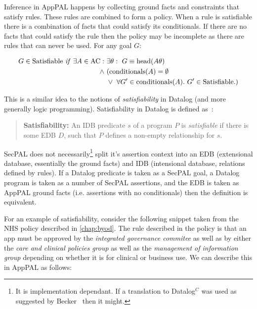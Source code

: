 \documentclass[thesis.tex]{subfiles}
\begin{document}
Inference in AppPAL happens by collecting ground facts and constraints
that satisfy rules. These rules are combined to form a policy. When a
rule is satisfiable there is a combination of facts that could satisfy
its conditionals. If there are no facts that could satisfy the rule
then the policy may be incomplete as there are rules that can never be
used.  For any goal $G$:

\begin{align*}
  G \in \text{Satisfiable}~\text{\textit{if}}~\exists A \in \text{AC}:~&\exists \theta:~G\equiv\text{head}(A\theta) \\
                                                              \wedge~ & (\text{conditionals}(A) = \emptyset \\
                                                                      & \vee~\forall G^\prime \in \text{conditionals}(A).~G^\prime \in \text{Satisfiable}.)
\end{align*}

This is a similar idea to the notions of \emph{satisfiability} in Datalog (and
more generally logic programming).  Satisfiability in Datalog is defined
as~\cite{alon_levy_equivalence_1993}:

\begin{quote}
  \textbf{Satisfiability:} An IDB predicate $s$ of a program $P$ is
  \emph{satisfiable} if there is some EDB $D$, such that $P$ defines a
  non-empty relationship for $s$.
\end{quote}

SecPAL does not necessarily\footnote{It is implementation dependant. If a
  translation to Datalog$^C$ was used as suggested by
  Becker~\cite{becker_secpal:_2010} then it might.} split it's assertion
  context into an EDB (extensional database, essentially the ground facts) and
  IDB (intensional database, relations defined by rules).  If a Datalog
  predicate is taken as a SecPAL goal, a Datalog program is taken as a number
  of SecPAL assertions, and the EDB is taken as AppPAL ground facts (i.e.
  assertions with no conditionals) then the definition is equivalent.

For an example of satisfiability, consider the following snippet taken from the
NHS policy described in \autoref{chap:byod}.  The rule described in the policy
is that an app must be approved by the \emph{integrated governance commitee} as
well as by either the \emph{care and clinical policies group} as well as the
\emph{management of information group} depending on whether it is for clinical
or business use. We can describe this in AppPAL as follows:
\end{document}
